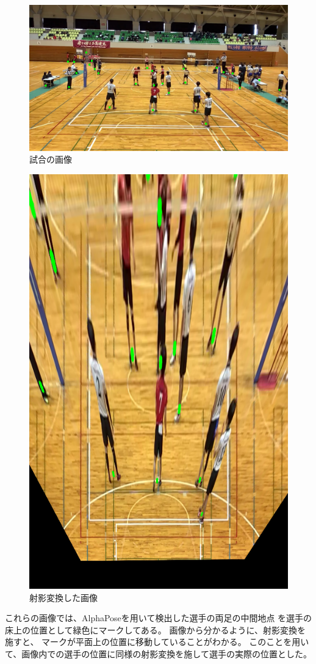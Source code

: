 \documentclass[twoside,twocolumn]{jsarticle}
\begin{document}
        \begin{figure}[h]
            \centering
            \includegraphics[width=0.9\hsize]{frame.png}
            \caption{試合の画像}
            \label{fig:frame}
        \end{figure}
        \begin{figure}[h]
            \centering
            \includegraphics[width=0.5\hsize]{warped.png}
            \caption{射影変換した画像}
            \label{fig:warped}
        \end{figure}

        これらの画像では、AlphaPoseを用いて検出した選手の両足の中間地点
        を選手の床上の位置として緑色にマークしてある。
        画像から分かるように、射影変換を施すと、
        マークが平面上の位置に移動していることがわかる。
        このことを用いて、画像内での選手の位置に同様の射影変換を施して選手の実際の位置とした。
\end{document}
